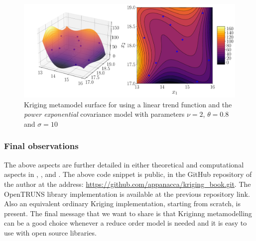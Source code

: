 \begin{figure}[h]
	\centering
	\includegraphics[width=0.9\linewidth]{appendix_a/kriging_openturns3}
	\caption{Kriging metamodel surface for using a linear trend function and the \textit{power exponential} covariance model with parameters $\nu=2$, $\theta=0.8$ and $\sigma=10$}
	\label{fig:kriging_openturns3}
\end{figure}


\subsubsection{Final observations}

The above aspects are further detailed in either theoretical and computational aspects in \citet{cavazzuti2012optimization}, \citet{dakota}, \citet{sacks1989design} and \citet{openturns}.
The above code snippet is public, in the GitHub repository of the author at the address: \url{https://github.com/appanacca/kriging_book.git}.
The OpenTRUNS library implementation is available at the previous repository link. Also an equivalent ordinary Kriging implementation, starting from scratch, is present.
The final message that we want to share is that Kriginng metamodelling can be a good choice whenever a reduce order model is needed and it is easy to use with open source libraries.
